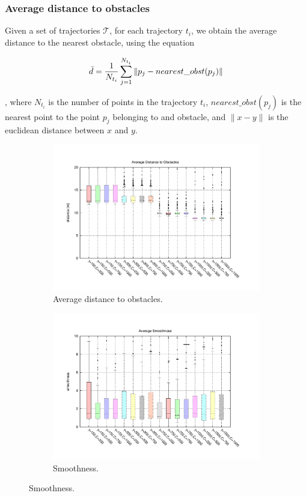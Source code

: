 \subsubsection{Average distance to obstacles}\label{ch:chapter06_02_01_01}
Given a set of trajectories $\mathcal{T}$, for each trajectory $t_i$, we obtain the average distance to the nearest obstacle, using the equation

\begin{equation}\label{eq:cp06_avg_dist}
  \bar{d} = {1 \over N_{t_i}} \sum_{j=1}^{N_{t_i}} \| p_j - nearest\_obst(p_j) \|
\end{equation}

, where $N_{t_i}$ is the number of points in the trajectory $t_i$, $nearest\_obst(p_j)$ is the nearest point to the point $p_j$ belonging to and obstacle, and $\| x - y \|$ is the euclidean distance between $x$ and $y$.

\begin{figure}[p]
  \centering
  \begin{subfigure}[b]{\textwidth}
	  \centering
	  \includegraphics[width=\textwidth,height=0.5\textwidth,trim=55 50 85 60,clip]{figure8}
	  \caption{Average distance to obstacles.}
	  \label{fig:cp06_avg_dist_msvmpp}
  \end{subfigure}  

  \begin{subfigure}[b]{\textwidth}
	  \centering
	  \includegraphics[width=\textwidth,height=0.5\textwidth,trim=55 50 85 60,clip]{figure9}
	  \caption{Smoothness.}
	  \label{fig:cp06_smoothness_msvmpp}
  \end{subfigure}        
\end{figure}

